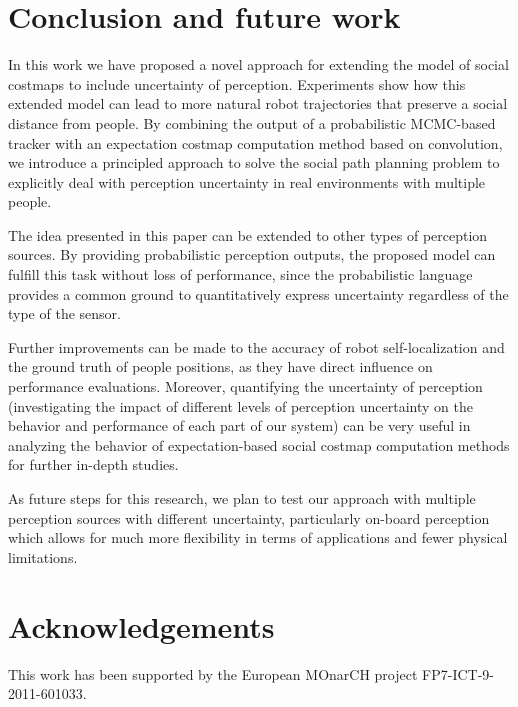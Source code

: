 \section{Conclusion and future work}
\label{sec:conclusion}

In this work we have proposed a novel approach for extending the model of social costmaps to include uncertainty of perception. Experiments show how this extended model can lead to more natural robot trajectories that preserve a social distance from people. By combining the output of a probabilistic MCMC-based tracker with an expectation costmap computation method based on convolution, we introduce a principled approach to solve the social path planning problem to explicitly deal with perception uncertainty in real environments with multiple people. 



The idea presented in this paper can be extended to other types of perception sources. By providing probabilistic perception outputs, the proposed model can fulfill this task without loss of performance, since the probabilistic language provides a common ground to quantitatively express uncertainty regardless of the type of the sensor. 


Further improvements can be made to the accuracy of robot self-localization and the ground truth of people positions, as they have direct influence on performance evaluations. Moreover, quantifying the uncertainty of perception (investigating the impact of different levels of perception uncertainty on the behavior and performance of each part of our system) can be very useful in analyzing the behavior of expectation-based social costmap computation methods for further in-depth studies.


As future steps for this research, we plan to test our approach with multiple perception sources with different uncertainty, particularly on-board perception which allows for much more flexibility in terms of applications and fewer physical limitations.






\section*{Acknowledgements}

This work has been supported by the European MOnarCH project FP7-ICT-9-2011-601033. 


